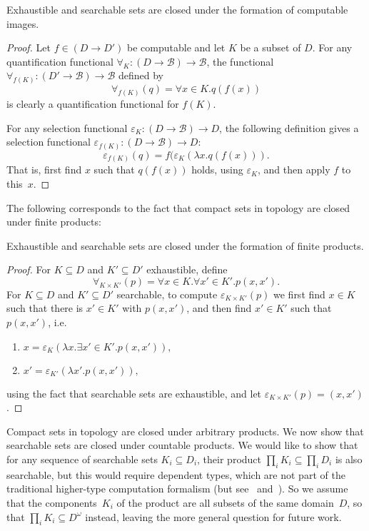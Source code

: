 \documentclass{LMCS}
\newcommand{\e}{\varepsilon}
\newcommand{\myomega}{\omega}
\newcommand{\licsmath}[1]{\[ #1 \]}
\newcommand{\licsmatht}[2]{\begin{enumerate}
\item[] \quad $#1$
\item[] \quad $#2$
\end{enumerate}}
\newcommand{\pBool}{\mathcal{B}}
\newcommand{\D}{D}
\begin{document}
\begin{prop} \label{image} Exhaustible and searchable sets are closed
  under the formation of computable images.
\end{prop}
\begin{proof}
  Let $f \in (\D \to \D')$ be computable and let $K$ be a subset of
  $D$.  For any quantification functional $\forall_K \colon (D \to
  \pBool) \to \pBool$, the functional $\forall_{f(K)} \colon (D' \to
  \pBool) \to \pBool$ defined by
\licsmath{\forall_{f(K)}(q)=\forall x \in K.q(f(x))}
is clearly a quantification functional for $f(K)$.  

For any selection functional $\e_K \colon (D \to \pBool) \to
D$, the following definition gives a selection functional
$\e_{f(K)} \colon (D \to \pBool) \to D$:
\licsmath{ \e_{f(K)}(q) =
  f(\e_K(\lambda x.q(f(x))).  }
That is, first find $x$ such that $q(f(x))$ holds, using
$\e_K$, and then apply $f$ to this~$x$.
\end{proof}

The following corresponds to the fact that compact sets in topology
are closed under finite products:
\begin{prop} \label{fin:prod}
  Exhaustible and searchable sets are closed under the formation of
  finite products.
\end{prop}
\begin{proof}
For $K \subseteq \D$ and $K' \subseteq \D'$ exhaustible, define
\licsmath{\forall_{K \times K'}(p)=\forall x \in K.\forall x' \in
    K'.p(x,x').}
For $K \subseteq \D$ and $K' \subseteq \D'$ searchable, to compute
  $\e_{K \times K'}(p)$ we first find $x \in K$ such that
  there is $x' \in K'$ with $p(x,x')$, and then find $x' \in K'$ such
  that $p(x,x')$, i.e.\
\licsmatht{x = \e_K(\lambda x.\exists x' \in K'.p(x,x')),}
{x' = \e_{K'}(\lambda x'. p(x,x')),}
using the fact that searchable sets are exhaustible,
and let $\e_{K \times K'}(p) = (x,x')$.
\end{proof}

Compact sets in topology are closed under arbitrary products.  We now
show that searchable sets are closed under countable products.  We
would like to show that for any sequence of searchable sets $K_i
\subseteq D_i$, their product $\prod_i {K_i} \subseteq \prod_i D_i$ is
also searchable, but this would require dependent types, which are not
part of the traditional higher-type computation formalism (but
see~\cite{berger:dependent} and~\cite{berger:dependent:1}).  So we
assume that the components~$K_i$ of the product are all subsets of the
same domain~$\D$, so that $\prod_i K_i \subseteq \D^\myomega$ instead,
leaving the more general question for future work.
\end{document}
